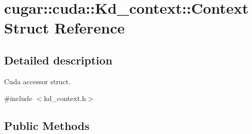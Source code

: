 \hypertarget{structcugar_1_1cuda_1_1_kd__context_1_1_context}{}\section{cugar\+:\+:cuda\+:\+:Kd\+\_\+context\+:\+:Context Struct Reference}
\label{structcugar_1_1cuda_1_1_kd__context_1_1_context}


\subsection{Detailed description}
Cuda accessor struct. 

{\ttfamily \#include $<$kd\+\_\+context.\+h$>$}

\subsection*{Public Methods}
